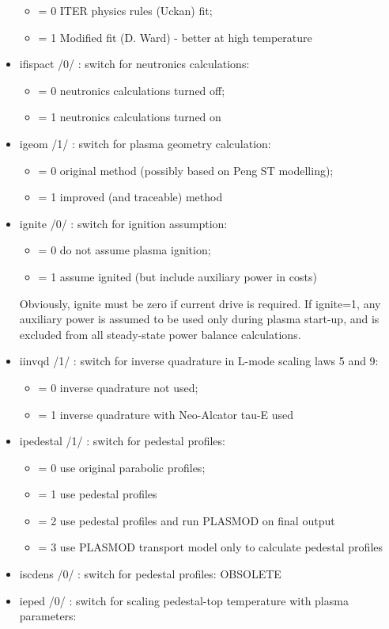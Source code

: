 \documentclass[]{article}
\providecommand{\tightlist}{%
  \setlength{\itemsep}{0pt}\setlength{\parskip}{0pt}}
\begin{document}
\begin{itemize}
  \begin{itemize}
  \tightlist
  \item
    = 0 ITER physics rules (Uckan) fit;
  \item
    = 1 Modified fit (D. Ward) - better at high temperature
  \end{itemize}
\item
  ifispact /0/ : switch for neutronics calculations:

  \begin{itemize}
  \tightlist
  \item
    = 0 neutronics calculations turned off;
  \item
    = 1 neutronics calculations turned on
  \end{itemize}
\item
  igeom /1/ : switch for plasma geometry calculation:

  \begin{itemize}
  \tightlist
  \item
    = 0 original method (possibly based on Peng ST modelling);
  \item
    = 1 improved (and traceable) method
  \end{itemize}
\item
  ignite /0/ : switch for ignition assumption:

  \begin{itemize}
  \tightlist
  \item
    = 0 do not assume plasma ignition;
  \item
    = 1 assume ignited (but include auxiliary power in costs)
  \end{itemize}

  Obviously, ignite must be zero if current drive is required. If
  ignite=1, any auxiliary power is assumed to be used only during plasma
  start-up, and is excluded from all steady-state power balance
  calculations.
\item
  iinvqd /1/ : switch for inverse quadrature in L-mode scaling laws 5
  and 9:

  \begin{itemize}
  \tightlist
  \item
    = 0 inverse quadrature not used;
  \item
    = 1 inverse quadrature with Neo-Alcator tau-E used
  \end{itemize}
\item
  ipedestal /1/ : switch for pedestal profiles:

  \begin{itemize}
  \tightlist
  \item
    = 0 use original parabolic profiles;
  \item
    = 1 use pedestal profiles
  \item
    = 2 use pedestal profiles and run PLASMOD on final output
  \item
    = 3 use PLASMOD transport model only to calculate pedestal profiles
  \end{itemize}
\item
  iscdens /0/ : switch for pedestal profiles: OBSOLETE
\item
  ieped /0/ : switch for scaling pedestal-top temperature with plasma
  parameters:


\end{itemize}
\end{document}

